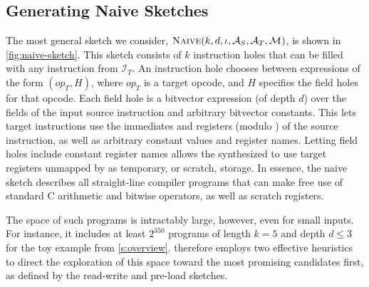 \subsection{Generating Naive Sketches}\label{s:algorithm:naive}

The most general sketch we consider, $\Naive(k,d,\iota,\arm_S,\arm_T,\Map)$, is
shown in \autoref{fig:naive-sketch}. This sketch consists of $k$ instruction
holes that can be filled with any instruction from $\mathcal{I}_T$. An
instruction hole chooses between expressions of the form $(\mathit{op}_T, H)$,
where $\mathit{op}_T$ is a target opcode, and $H$ specifies the field holes for
that opcode. Each field hole is a bitvector expression (of depth $d$) over the
fields of the input source instruction and arbitrary bitvector constants. This
lets target instructions use the immediates and registers (modulo \Map) of the
source instruction, as well as arbitrary constant values and register names.
Letting field holes include constant register names allows the synthesized
\minicompilers to use target registers unmapped by \Map as temporary, or
scratch, storage. In essence, the naive sketch describes all straight-line
compiler programs that can make free use of standard C arithmetic and bitwise
operators, as well as scratch registers.\tighten 

The space of such programs is intractably large, however, even for small inputs.
For instance, it includes at least $2^{350}$ programs of length $k=5$ and depth
$d\leq 3$ for the toy example from \autoref{s:overview}. \jitsynth therefore
employs two effective heuristics to direct the exploration of this space toward
the most promising candidates first, as defined by the read-write and pre-load
sketches.\tighten 

